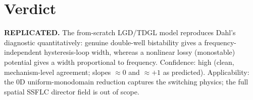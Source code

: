 \documentclass[11pt]{article}
\begin{document}
\section{Verdict}
\textbf{REPLICATED.} The from-scratch LGD/TDGL model reproduces Dahl's
diagnostic quantitatively: genuine double-well bistability gives a
frequency-independent hysteresis-loop width, whereas a nonlinear lossy
(monostable) potential gives a width proportional to frequency. Confidence:
high (clean, mechanism-level agreement; slopes $\approx0$ and $\approx+1$ as
predicted). Applicability: the $0$D uniform-monodomain reduction captures the
switching physics; the full spatial SSFLC director field is out of scope.
\end{document}
